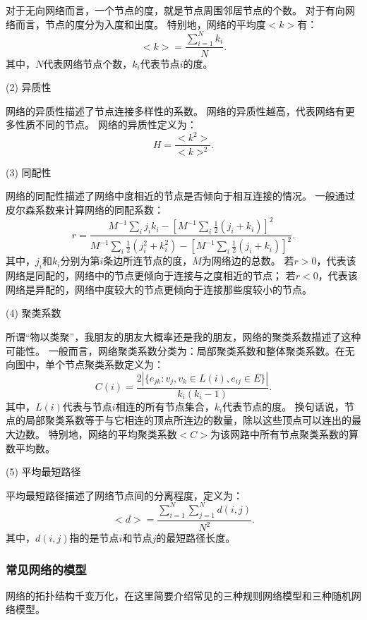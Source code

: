 对于无向网络而言，一个节点的度，就是节点周围邻居节点的个数。
对于有向网络而言，节点的度分为入度和出度。
特别地，网络的平均度$ <k> $有：
\begin{equation}
<k> = \frac{\sum_{i=1}^{N}{k_i}}{N}.
\end{equation}
其中，$ N $代表网络节点个数，$ k_i $代表节点$ i $的度。

(2) 异质性

网络的异质性描述了节点连接多样性的系数。
网络的异质性越高，代表网络有更多性质不同的节点。
网络的异质性定义为：
\begin{equation}
H = \frac{<k^2>}{<k>^2}.
\end{equation}

(3) 同配性

网络的同配性描述了网络中度相近的节点是否倾向于相互连接的情况。
一般通过皮尔森系数来计算网络的同配系数：
\begin{equation}
r = \frac{M^{-1}\sum_{i}{j_ik_i}-[M^{-1}\sum_{i}\frac{1}{2}{(j_i+k_i)}]^2}{M^{-1}\sum_{i}\frac{1}{2}{(j_i^2+k_i^2)}-[M^{-1}\sum_{i}{\frac{1}{2}(j_i+k_i)}]^2}.
\end{equation}
其中，$ j_i $和$ k_i $分别为第$ i $条边所连节点的度，$ M $为网络边的总数。
若$ r>0 $，代表该网络是同配的，网络中的节点更倾向于连接与之度相近的节点；
若$ r<0 $，代表该网络是异配的，网络中度较大的节点更倾向于连接那些度较小的节点。

(4) 聚类系数

所谓“物以类聚”，我朋友的朋友大概率还是我的朋友，网络的聚类系数描述了这种可能性。
一般而言，网络聚类系数分类为：局部聚类系数和整体聚类系数。在无向图中，单个节点聚类系数定义为：
\begin{equation}
C(i) = \frac{2|\{e_{jk}:v_j,v_k\in L(i), e_{ij}\in E\}|}{k_i(k_i-1)}.
\end{equation}
其中，$ L(i) $代表与节点$ i $相连的所有节点集合，$ k_i $代表节点的度。
换句话说，节点的局部聚类系数等于与它相连的顶点所连边的数量，除以这些顶点可以连出的最大边数。
特别地，网络的平均聚类系数$ <C> $为该网路中所有节点聚类系数的算数平均数。

(5) 平均最短路径

平均最短路径描述了网络节点间的分离程度，定义为：
\begin{equation}
<d> = \frac{\sum_{i=1}^{N}\sum_{j=1}^{N}d(i,j)}{N^2}.
\end{equation}
其中，$ d(i,j) $指的是节点$ i $和节点$ j $的最短路径长度。

\subsubsection{常见网络的模型}
网络的拓扑结构千变万化，在这里简要介绍常见的三种规则网络模型和三种随机网络模型。

